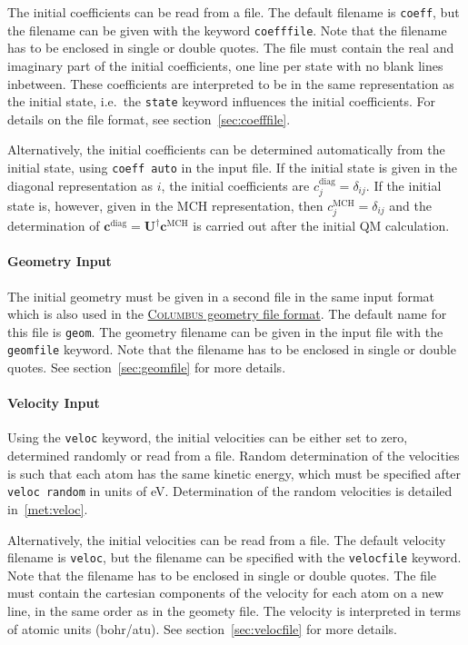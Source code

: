 \documentclass[a4paper,11pt,DIV=15,openany,twoside=false]{scrbook}
\newcommand{\ttt}[1]{\texttt{#1}}
\renewcommand{\vec}[1]{\ensuremath{\mathbf{#1}}}
\begin{document}
The initial coefficients can be read from a file. The default filename is \ttt{coeff}, but the filename can be given with the keyword \ttt{coefffile}. Note that the filename has to be enclosed in single or double quotes. The file must contain the real and imaginary part of the initial coefficients, one line per state with no blank lines inbetween. These coefficients are interpreted to be in the same representation as the initial state, i.e.\ the \ttt{state} keyword influences the initial coefficients. For details on the file format, see section~\ref{sec:coefffile}.

Alternatively, the initial coefficients can be determined automatically from the initial state, using \ttt{coeff auto} in the input file. If the initial state is given in the diagonal representation as $i$, the initial coefficients are $c^{\text{diag}}_j=\delta_{ij}$. If the initial state is, however, given in the MCH representation, then $c^{\text{MCH}}_j=\delta_{ij}$ and the determination of $\vec{c}^{\text{diag}}=\vec{U}^\dagger\vec{c}^{\text{MCH}}$ is carried out after the initial QM calculation. 

\paragraph{Geometry Input}

The initial geometry must be given in a second file in the same input format which is also used in the \href{http://www.univie.ac.at/columbus/docs_COL70/documentation_main.html}{\textsc{Columbus} geometry file format}. The default name for this file is \ttt{geom}. The geometry filename can be given in the input file with the \ttt{geomfile} keyword. Note that the filename has to be enclosed in single or double quotes. See section~\ref{sec:geomfile} for more details.

\paragraph{Velocity Input}

Using the \ttt{veloc} keyword, the initial velocities can be either set to zero, determined randomly or read from a file. Random determination of the velocities is such that each atom has the same kinetic energy, which must be specified after \ttt{veloc random} in units of eV. Determination of the random velocities is detailed in~\ref{met:veloc}.

Alternatively, the initial velocities can be read from a file. 
The default velocity filename is \ttt{veloc}, but the filename can be specified with the \ttt{velocfile} keyword. Note that the filename has to be enclosed in single or double quotes. The file must contain the cartesian components of the velocity for each atom on a new line, in the same order as in the geomety file. The velocity is interpreted in terms of atomic units (bohr/atu). See section~\ref{sec:velocfile} for more details.
\end{document}
